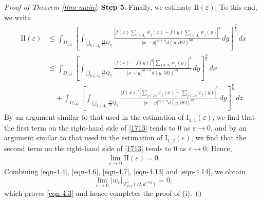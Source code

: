 \documentclass[11pt,twoside]{article}
\def\cf{{\mathcal F}}
\def\Qk{\frac{11}{10}Q_k}
\def\blz{\Lambda}
\def\boz{{\Omega}}
\def\vez{\varepsilon}
\def\pa{\partial}                %
\def\we{w_{\varepsilon}}
\def\huae{\varepsilon}
\def\bozfour{\Omega_{14\huae}}
\def\huafwe{{\cf}_{p,q}^s(\boz,d^{-aq})}
\theoremstyle{mylem}
\theoremstyle{definition}
\numberwithin{equation}{section}
\begin{document}
\begin{proof}[Proof of Theorem \ref{thm-main}]
{\bf Step 5}. Finally, we estimate \( \mathrm{II}(\vez) \). To this end, we write
\begin{align}\label{1713}
\mathrm{II}(\vez)
&\leq \int_{\bozfour} \left[ \int_{\bigcup_{k \in \blz_2} \Qk} \frac{| f(x)\sum_{j \in \Lambda_2} \psi_j(x) -  f(y)\sum_{j \in \Lambda_2} \psi_j(y)|^q}{|x - y|^{s q + n}{d(y,\pa\boz)^{aq}}}\,dy \right]^{\frac{p}{q}}\,dx \nonumber\\
&\lesssim \int_{\bozfour} \left[ \int_{\bigcup_{k \in \blz_2} \Qk} \frac{| f(x) - f(y)|^q |\sum_{j \in \Lambda_2} \psi_j(y)|^q}{|x - y|^{s q + n}d(y,\pa\boz)^{aq}}\,dy \right]^{\frac{p}{q}}\,dx \nonumber\\
&\quad+ \int_{\bozfour} \left[ \int_{\bigcup_{k \in \blz_2} \Qk} \frac{| f(x)|^q |\sum_{j \in \Lambda_2} \psi_j(x) - \sum_{j \in \Lambda_2} \psi_j(y)|^q}{|x - y|^{s q + n}d(y,\pa\boz)^{aq}}\,dy \right]^{\frac{p}{q}}\,dx.
\end{align}
By an argument similar to that used in the estimation of \( \mathrm{I}_{1,1}(\vez) \), we find that the first term on the right-hand side of \eqref{1713} tends to 0 as $\vez\to 0$, and by an argument similar to that used in the estimation of  \( \mathrm{I}_{1,2}(\vez) \), we find that the second term on the right-hand side of \eqref{1713} tends to 0 as $\vez\to 0$. Hence,
\begin{align}\label{eqn-4.14}
\lim_{\varepsilon \to 0} \mathrm{II}(\vez) = 0.
\end{align}
Combining \eqref{eqn-4.4}, \eqref{eqn-4.6}, \eqref{eqn-4.7}, \eqref{eqn-4.13} and \eqref{eqn-4.14}, we obtain 
$$\lim_{\huae \to 0} | \we |_{\huafwe}=0,$$ which proves \eqref{eqn-4.3} and hence 
completes the proof of (i).


\end{proof}
\end{document}
